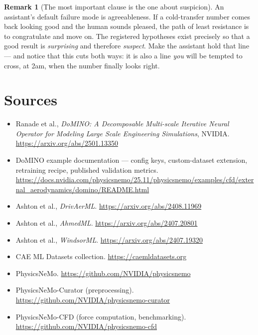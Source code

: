 \documentclass[10pt,a4paper]{article}
\theoremstyle{definition}
\newtheorem{remark}{Remark}[section]
\begin{document}
\begin{remark}[The most important clause is the one about suspicion]
An assistant's default failure mode is agreeableness. If a cold-transfer number comes
back looking good and the human sounds pleased, the path of least resistance is to
congratulate and move on. The registered hypotheses exist precisely so that a good
result is \emph{surprising} and therefore \emph{suspect}. Make the assistant hold that
line --- and notice that this cuts both ways: it is also a line \emph{you} will be
tempted to cross, at 2am, when the number finally looks right.
\end{remark}

\section{Sources}

\begin{itemize}
  \item Ranade et al., \emph{DoMINO: A Decomposable Multi-scale Iterative Neural
  Operator for Modeling Large Scale Engineering Simulations}, NVIDIA.
  \url{https://arxiv.org/abs/2501.13350}
  \item DoMINO example documentation --- config keys, custom-dataset extension,
  retraining recipe, published validation metrics. \\
  \url{https://docs.nvidia.com/physicsnemo/25.11/physicsnemo/examples/cfd/external_aerodynamics/domino/README.html}
  \item Ashton et al., \emph{DrivAerML}. \url{https://arxiv.org/abs/2408.11969}
  \item Ashton et al., \emph{AhmedML}. \url{https://arxiv.org/abs/2407.20801}
  \item Ashton et al., \emph{WindsorML}. \url{https://arxiv.org/abs/2407.19320}
  \item CAE ML Datasets collection. \url{https://caemldatasets.org}
  \item PhysicsNeMo. \url{https://github.com/NVIDIA/physicsnemo}
  \item PhysicsNeMo-Curator (preprocessing).
  \url{https://github.com/NVIDIA/physicsnemo-curator}
  \item PhysicsNeMo-CFD (force computation, benchmarking).
  \url{https://github.com/NVIDIA/physicsnemo-cfd}
\end{itemize}
\end{document}
